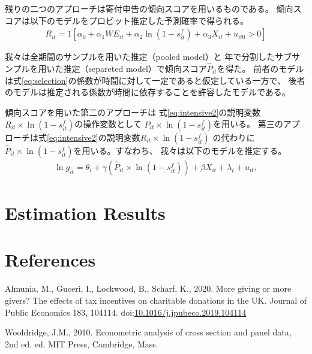 \documentclass[
  11pt,
  a4paper,
]{article}
\newlength{\cslhangindent}
\newlength{\cslentryspacingunit} %
\newenvironment{CSLReferences}[2] %
 {%
  \setlength{\parindent}{0pt}
  \ifodd #1
  \let\oldpar\par
  \def\par{\hangindent=\cslhangindent\oldpar}
  \fi
  \setlength{\parskip}{#2\cslentryspacingunit}
 }%
 {}
\begin{document}
残りの二つのアプローチは寄付申告の傾向スコアを用いるものである。
傾向スコアは以下のモデルをプロビット推定した予測確率で得られる。
\begin{align}
  R_{it} = 1[
    \alpha_0 + \alpha_1 WE_{it} + \alpha_2 \ln(1 - s^f_{it})
    + \alpha_3 X_{it} + u_{it0} > 0
  ] \label{eq:selection}
\end{align}

我々は全期間のサンプルを用いた推定（pooled model）と
年で分割したサブサンプルを用いた推定（separeted model）で傾向スコア\(\hat{P}_{it}\)を得た。
前者のモデルは式\eqref{eq:selection}の係数が時間に対して一定であると仮定している一方で、
後者のモデルは推定される係数が時間に依存することを許容したモデルである。

傾向スコアを用いた第二のアプローチは
式\eqref{eq:intensive2}の説明変数\(R_{it} \times \ln (1 - s^f_{it})\)の操作変数として
\(\hat{P}_{it} \times \ln (1 - s^f_{it})\)を用いる。
第三のアプローチは式\eqref{eq:intensive2}の説明変数\(R_{it} \times \ln (1 - s^f_{it})\)
の代わりに\(\hat{P}_{it} \times \ln (1 - s^f_{it})\)を用いる。すなわち、
我々は以下のモデルを推定する。
\begin{align}
  \ln g_{it} = \theta_i + \gamma (\hat{P}_{it} \times \ln (1 - s^f_{it}))
    + \beta X_{it} + \lambda_t + u_{it}, \label{eq:intensive3}
\end{align}

\hypertarget{result}{%
\section{Estimation Results}\label{result}}

\hypertarget{references}{%
\section*{References}\label{references}}

\hypertarget{refs}{}
\begin{CSLReferences}{1}{0}
\leavevmode{}%
Almunia, M., Guceri, I., Lockwood, B., Scharf, K., 2020. More giving or more givers? {The} effects of tax incentives on charitable donations in the {UK}. Journal of Public Economics 183, 104114. doi:\href{https://doi.org/10.1016/j.jpubeco.2019.104114}{10.1016/j.jpubeco.2019.104114}

\leavevmode{}%
Wooldridge, J.M., 2010. Econometric analysis of cross section and panel data, 2nd ed. ed. {MIT Press}, {Cambridge, Mass}.

\end{CSLReferences}
\end{document}
